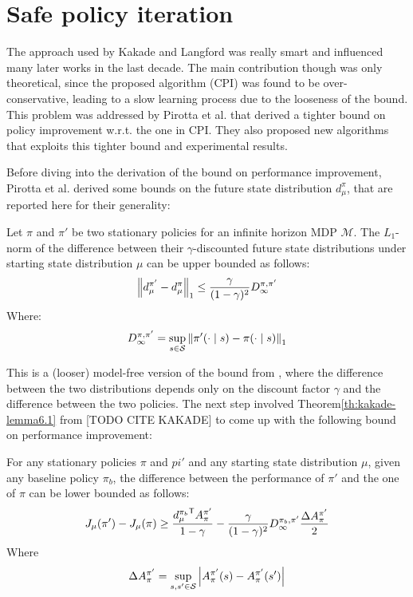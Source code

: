 \section{Safe policy iteration}
\label{sec:spi}
The approach used by Kakade and Langford was really smart and influenced many later works in the last decade. The main contribution though was only theoretical, since the proposed algorithm (CPI) was found to be over-conservative, leading to a slow learning process due to the looseness of the bound. \\
This problem was addressed by Pirotta et al. \cite{safe_iteration} that derived a tighter bound on policy improvement w.r.t. the one in CPI. They also proposed new algorithms that exploits this tighter bound and experimental results.

Before diving into the derivation of the bound on performance improvement, Pirotta et al. derived some bounds on the future state distribution $d_{\mu}^{\pi}$, that are reported here for their generality:

\begin{theorem}
Let $\pi$ and $\pi'$ be two stationary policies for an infinite horizon MDP $\mathcal{M}$. The $L_1$-norm of the difference between their $\gamma$-discounted future state distributions under starting state distribution $\mu$ can be upper bounded as follows:
\begin{equation}
\left\| d_{\mu}^{\pi'} - d_{\mu}^{\pi} \right\|_{1} \leq \frac{\gamma}{(1-\gamma)^2}D_\infty^{\pi, \pi'}
\end{equation}
Where:
\begin{equation}
D_\infty^{\pi, \pi'} = \sup_{s\in\mathcal{S}}\left\| \pi'(\cdot\mid s) - \pi(\cdot \mid s) \right\|_{1}
\end{equation}
\end{theorem}

This is a (looser) model-free version of the bound from \cite{safe_iteration}, where the difference between the two distributions depends only on the discount factor $\gamma$ and the difference between the two policies. The next step involved Theorem\ref{th:kakade-lemma6.1} from [TODO CITE KAKADE] to come up with the following bound on performance improvement:

\begin{theorem}\label{th:pirotta-bound1}
For any stationary policies $\pi$ and $pi'$ and any starting state distribution $\mu$, given any baseline policy $\pi_b$, the difference between the performance of $\pi'$ and the one of $\pi$ can be lower bounded as follows:
\begin{equation}
J_{\mu}(\pi') - J_\mu(\pi) \geq \frac{{d_\mu^{\pi_b}}^{\mathsf{T}}A_\pi^{\pi'}}{1-\gamma} - \frac{\gamma}{(1-\gamma)^2}{D_\infty^{\pi_b, \pi'}} \frac{\Delta A_{\pi}^{\pi'}}{2}
\end{equation}
Where
\begin{equation}
\Delta A_{\pi}^{\pi'} = \sup_{s, s'\in\mathcal{S}}\left|{A_\pi^{\pi'}(s) - A_\pi^{\pi'}(s')}\right|
\end{equation}
\end{theorem}

